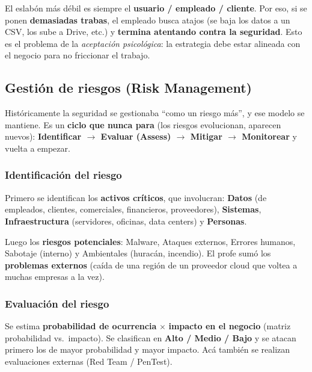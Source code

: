 \documentclass[../main.tex]{subfiles}
\begin{document}
\begin{destacado}
El eslabón más débil es siempre el \textbf{usuario / empleado / cliente}. Por
eso, si se ponen \textbf{demasiadas trabas}, el empleado busca atajos (se baja
los datos a un CSV, los sube a Drive, etc.) y \textbf{termina atentando contra
la seguridad}. Esto es el problema de la \emph{aceptación psicológica}: la
estrategia debe estar alineada con el negocio para no friccionar el trabajo.
\end{destacado}

\subsection{Gestión de riesgos (Risk Management)}

Históricamente la seguridad se gestionaba ``como un riesgo más'', y ese modelo
se mantiene. Es un \textbf{ciclo que nunca para} (los riesgos evolucionan,
aparecen nuevos): \textbf{Identificar $\to$ Evaluar (Assess) $\to$ Mitigar
$\to$ Monitorear} y vuelta a empezar.

\subsubsection{Identificación del riesgo}
Primero se identifican los \textbf{activos críticos}, que involucran:
\textbf{Datos} (de empleados, clientes, comerciales, financieros, proveedores),
\textbf{Sistemas}, \textbf{Infraestructura} (servidores, oficinas, data
centers) y \textbf{Personas}.

Luego los \textbf{riesgos potenciales}: Malware, Ataques externos, Errores
humanos, Sabotaje (interno) y Ambientales (huracán, incendio). El profe sumó
los \textbf{problemas externos} (caída de una región de un proveedor cloud que
voltea a muchas empresas a la vez).

\subsubsection{Evaluación del riesgo}
Se estima \textbf{probabilidad de ocurrencia} $\times$ \textbf{impacto en el
negocio} (matriz probabilidad vs.\ impacto). Se clasifican en \textbf{Alto /
Medio / Bajo} y se atacan primero los de mayor probabilidad y mayor impacto.
Acá también se realizan evaluaciones externas (Red Team / PenTest).
\end{document}
